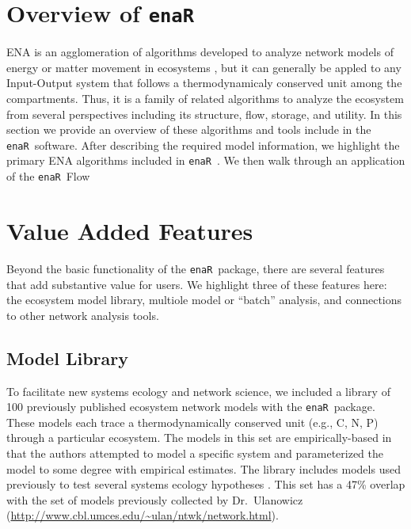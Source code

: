 \documentclass[11pt]{article}
\newcommand{\enaR}{\texttt{enaR}}
\begin{document}
\begin{spacing}{2}
\section{Overview of \enaR}
ENA is an agglomeration of algorithms developed to analyze network
models of energy or matter movement in ecosystems
\citep[e.g.,][]{hannon73, fath99_review, ulanowicz86},
but it can generally be appled to any Input-Output system that follows
a thermodynamicaly conserved unit among the compartments.  Thus, it is a
family of related algorithms to analyze the ecosystem from several
perspectives including its structure, flow, storage, and utility.
In this section we provide an overview of these algorithms and tools
include in the \enaR\ software.  After describing the required model
information, we highlight the primary ENA algorithms included in
\enaR\ .  We then walk through an application of the \enaR\ Flow

\section{Value Added Features}
Beyond the basic functionality of the \enaR\ package, there are
several features that add substantive value for users.  We highlight
three of these features here: the ecosystem model library, multiole
model or ``batch'' analysis, and connections to other network analysis
tools.

\subsection{Model Library}
To facilitate new systems ecology and network science, we included a
library of 100 previously published ecosystem network models with the
\enaR\ package. These models each trace a thermodynamically conserved
unit (e.g., C, N, P) through a particular ecosystem.  The models in
this set are empirically-based in that the authors attempted to model
a specific system and parameterized the model to some degree with
empirical estimates.  The library includes models used previously to
test several systems ecology hypotheses \citep{borrett10_idd,
  borrett10_hmg, salas11_did, borrett13}.  This set has a 47\%
overlap with the set of models previously collected by Dr.\ Ulanowicz
(\url{http://www.cbl.umces.edu/~ulan/ntwk/network.html}).


\end{spacing}
\end{document}
